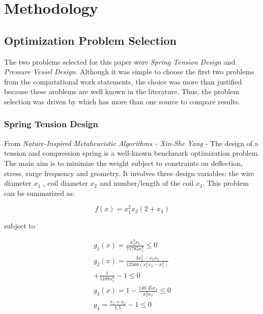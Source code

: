 \documentclass[conference]{IEEEtran}
\begin{document}
\section{Methodology}
\label{sec:methodology}

\subsection{Optimization Problem Selection}
\label{subsec:optimization-problem-selection}
The two problems selected for this paper were \textit{Spring Tension Design} and \textit{Pressure Vessel Design}. Although it was simple
to choose the first two problems from the computational work statements, the choice was more than justified because these aroblems are well
known in the literature.
Thus, the problem selection was driven by which has more than one source to compare results.

\subsubsection{Spring Tension Design}
\label{subsubsec:methodology-spring-tension-design}
From \textit{Nature-Inspired Metaheuristic Algorithms - Xin-She Yang} -
The design of a tension and compression spring is a well-known benchmark
optimization problem.
The main aim is to minimize the weight subject
to constraints on deflection, stress, surge frequency and geometry. It involves
three design variables: the wire diameter $x_1$ , coil diameter $x_2$ and
number/length of the coil $x_3$.
This problem can be summarized as:

\begin{equation}
    f (x) = x_1^2 x_2 (2 + x_3)
\end{equation}

subject to

\begin{equation}
    \begin{split}
        g_1(x) = \frac{x_2^3 x_3}{71785 x_1^4} \leq 0\\
        g_2(x) = \frac{4 x_2^2 - x_1 x_2}{12566 \left( x_1^3 x_2 - x_1^4\right)}\\
        + \frac{1}{5108 x_1^2} -1 \leq 0\\
        g_3(x) = 1 - \frac{140.45 x_1}{x_2^2 x_3} \leq 0\\
        g_4 = \frac{x_1 + x_2}{1.5} - 1 \leq 0
    \end{split}
\end{equation}
\end{document}
